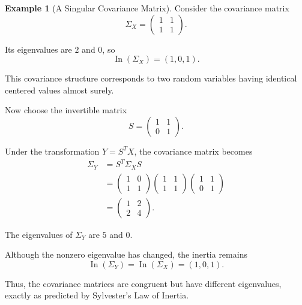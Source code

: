 \documentclass[11pt]{article}
\theoremstyle{definition}
\newtheorem{example}[theorem]{Example}
\theoremstyle{remark}
\begin{document}
\begin{example}[A Singular Covariance Matrix]

Consider the covariance matrix
\[
    \Sigma_X=
    \begin{pmatrix}
        1&1\\
        1&1
    \end{pmatrix}.
\]

Its eigenvalues are $2$ and $0$, so
\[
    \operatorname{In}(\Sigma_X)=(1,0,1).
\]

This covariance structure corresponds to
two random variables having identical
centered values almost surely.

Now choose the invertible matrix
\[
    S=
    \begin{pmatrix}
        1&1\\
        0&1
    \end{pmatrix}.
\]

Under the transformation $Y=S^TX$,
the covariance matrix becomes
\[
\begin{aligned}
    \Sigma_Y
    &=S^T\Sigma_XS\\
    &=
    \begin{pmatrix}
        1&0\\
        1&1
    \end{pmatrix}
    \begin{pmatrix}
        1&1\\
        1&1
    \end{pmatrix}
    \begin{pmatrix}
        1&1\\
        0&1
    \end{pmatrix}\\
    &=
    \begin{pmatrix}
        1&2\\
        2&4
    \end{pmatrix}.
\end{aligned}
\]

The eigenvalues of $\Sigma_Y$ are $5$ and $0$.

Although the nonzero eigenvalue has changed,
the inertia remains
\[
    \boxed{
    \operatorname{In}(\Sigma_Y)
    =\operatorname{In}(\Sigma_X)
    =(1,0,1).
    }
\]

Thus, the covariance matrices are congruent
but have different eigenvalues, exactly as
predicted by Sylvester's Law of Inertia.

\end{example}
\end{document}

